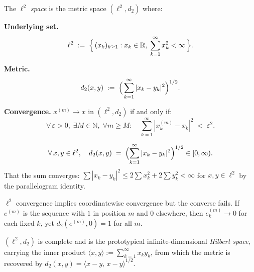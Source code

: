 
\begin{tcolorbox}[colback=propbox, colframe=propborder, arc=2pt,
  left=6pt, right=6pt, top=4pt, bottom=4pt,
  title={\small\textbf{Definition ($\ell^2$ — Square-Summable Sequence Space)}},
  fonttitle=\small\bfseries]
\begin{definition}
\label{def:ell2}
The \emph{$\ell^2$ space} is the metric space $(\ell^2, d_2)$ where:

\medskip
\noindent\textbf{Underlying set.}
\[
\ell^2 \;:=\; \Bigl\{\,(x_k)_{k \ge 1} : x_k \in \mathbb{R},\;
\sum_{k=1}^\infty x_k^2 < \infty\,\Bigr\}.
\]

\medskip
\noindent\textbf{Metric.}
\[
d_2(x,y) \;:=\; \Bigl(\,\sum_{k=1}^\infty |x_k - y_k|^2\Bigr)^{1/2}.
\]

\medskip
\noindent\textbf{Convergence.}\quad
$x^{(m)} \to x$ in $(\ell^2, d_2)$ if and only if:
\[
\forall\,\varepsilon > 0,\;\exists M \in \mathbb{N},\;
\forall m \ge M:\quad
\sum_{k=1}^\infty |x^{(m)}_k - x_k|^2 \;<\; \varepsilon^2.
\]
\end{definition}
\end{tcolorbox}

\begin{remark*}
\[
\forall\, x, y \in \ell^2, \quad
d_2(x,y) \;=\; \Bigl(\sum_{k=1}^\infty |x_k - y_k|^2\Bigr)^{1/2} \in [0,\infty).
\]
That the sum converges: $\sum|x_k-y_k|^2 \le 2\sum x_k^2 + 2\sum y_k^2 < \infty$
for $x, y \in \ell^2$ by the parallelogram identity.
\end{remark*}

\begin{remark*}
$\ell^2$ convergence implies coordinatewise convergence but the converse
fails. If $e^{(m)}$ is the sequence with $1$ in position $m$ and $0$
elsewhere, then $e^{(m)}_k \to 0$ for each fixed $k$, yet
$d_2(e^{(m)}, 0) = 1$ for all $m$.
\end{remark*}

\begin{remark*}
$(\ell^2, d_2)$ is complete and is the prototypical infinite-dimensional
\emph{Hilbert space}, carrying the inner product
$\langle x, y \rangle := \sum_{k=1}^\infty x_k y_k$, from which the
metric is recovered by $d_2(x,y) = \langle x-y,\, x-y\rangle^{1/2}$.
\end{remark*}

